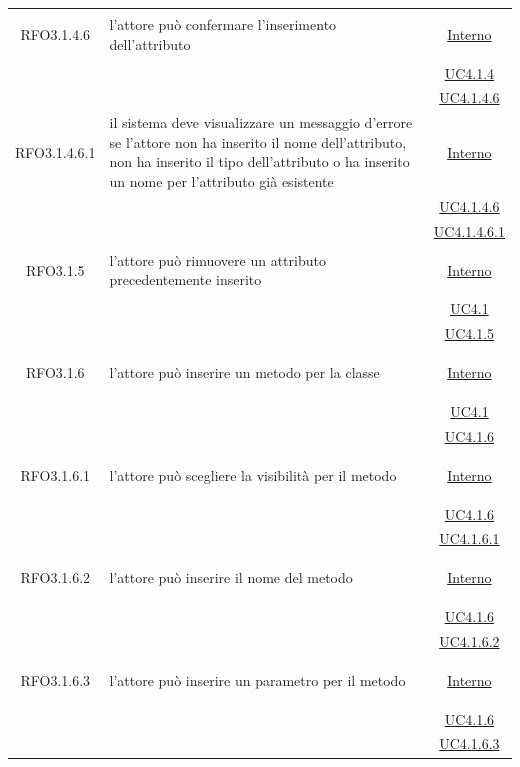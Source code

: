 \begin{longtable}{|c|>{\centering}m{7cm}|c|}
\hypertarget{RFO3.1.4.6}{RFO3.1.4.6} & l'attore può confermare l'inserimento dell'attributo & \hyperlink{Interno}{Interno}\\
& &\hyperref[UC4.1.4]{UC4.1.4}\\
& &\hyperref[UC4.1.4.6]{UC4.1.4.6}\\ \hline

\hypertarget{RFO3.1.4.6.1}{RFO3.1.4.6.1} & il sistema deve visualizzare un messaggio d'errore se l'attore non ha inserito il nome dell'attributo, non ha inserito il tipo dell'attributo o ha inserito un nome per l'attributo già esistente & \hyperlink{Interno}{Interno}\\
& &\hyperref[UC4.1.4.6]{UC4.1.4.6}\\
& &\hyperref[UC4.1.4.6.1]{UC4.1.4.6.1}\\ \hline

\hypertarget{RFO3.1.5}{RFO3.1.5} & l'attore può rimuovere un attributo precedentemente inserito & \hyperlink{Interno}{Interno}\\
& &\hyperref[UC4.1]{UC4.1}\\
& &\hyperref[UC4.1.5]{UC4.1.5}\\ \hline

\hypertarget{RFO3.1.6}{RFO3.1.6} & l'attore può inserire un metodo per la classe &\hyperlink{Interno}{Interno}\\
& &\hyperref[UC4.1]{UC4.1}\\
& &\hyperref[UC4.1.6]{UC4.1.6}\\ \hline

\hypertarget{RFO3.1.6.1}{RFO3.1.6.1} & l'attore può scegliere la visibilità per il metodo &\hyperlink{Interno}{Interno}\\
& &\hyperref[UC4.1.6]{UC4.1.6}\\
& &\hyperref[UC4.1.6.1]{UC4.1.6.1}\\ \hline

\hypertarget{RFO3.1.6.2}{RFO3.1.6.2} & l'attore può inserire il nome del metodo & \hyperlink{Interno}{Interno}\\
& &\hyperref[UC4.1.6]{UC4.1.6}\\
& &\hyperref[UC4.1.6.2]{UC4.1.6.2}\\ \hline

\hypertarget{RFO3.1.6.3}{RFO3.1.6.3} & l'attore può inserire un parametro per il metodo & \hyperlink{Interno}{Interno}\\
& &\hyperref[UC4.1.6]{UC4.1.6}\\
& &\hyperref[UC4.1.6.3]{UC4.1.6.3}\\ \hline


\end{longtable}
